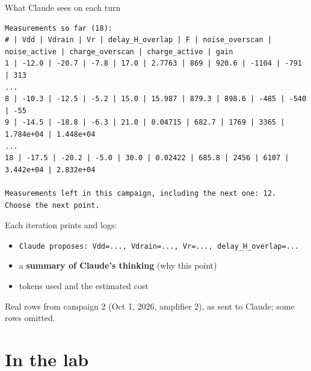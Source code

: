 \documentclass[aspectratio=169,10pt]{beamer}
\begin{document}
\begin{frame}[fragile]{What Claude sees on each turn}
\begin{lstlisting}
Measurements so far (18):
# | Vdd | Vdrain | Vr | delay_H_overlap | F | noise_overscan | noise_active | charge_overscan | charge_active | gain
1 | -12.0 | -20.7 | -7.8 | 17.0 | 2.7763 | 869 | 920.6 | -1104 | -791 | 313
...
8 | -10.3 | -12.5 | -5.2 | 15.0 | 15.987 | 879.3 | 898.6 | -485 | -540 | -55
9 | -14.5 | -18.8 | -6.3 | 21.0 | 0.04715 | 682.7 | 1769 | 3365 | 1.784e+04 | 1.448e+04
...
18 | -17.5 | -20.2 | -5.0 | 30.0 | 0.02422 | 685.8 | 2456 | 6107 | 3.442e+04 | 2.832e+04

Measurements left in this campaign, including the next one: 12.
Choose the next point.
\end{lstlisting}
  \small
  Each iteration prints and logs:
  \begin{itemize}
    \item \texttt{Claude proposes: Vdd=..., Vdrain=..., Vr=..., delay\_H\_overlap=...}
    \item a \textbf{summary of Claude's thinking} (why this point)
    \item tokens used and the estimated cost
  \end{itemize}
  {\scriptsize Real rows from campaign 2 (Oct 1, 2026, amplifier 2), as sent to Claude; some rows omitted.}
\end{frame}

\section{In the lab}
\end{document}
